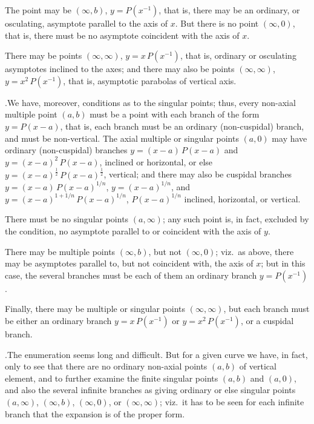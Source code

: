 \documentclass[11pt]{article}
\begin{document}
The point may be $(\infty,b)$, $y = P(x^{-1})$, that is, there may be an ordinary, or osculating, asymptote parallel to the axis of $x$. But there is no point $(\infty,0)$, that is, there must be no asymptote coincident with the axis of $x$.

There may be points $(\infty,\infty)$, $y = x\,P(x^{-1})$, that is, ordinary or osculating asymptotes inclined to the axes; and there may also be points $(\infty,\infty)$, $y = x^{2}\,P(x^{-1})$, that is, asymptotic parabolas of vertical axis.

\medskip

.\quad We have, moreover, conditions as to the singular points; thus, every non-axial multiple point $(a,b)$ must be a point with each branch of the form $y = P(x-a)$, that is, each branch must be an ordinary (non-cuspidal) branch, and must be non-vertical. The axial multiple or singular points $(a,0)$ may have ordinary (non-cuspidal) branches $y = (x-a)\,P(x-a)$ and $y = (x-a)^{2}\,P(x-a)$, inclined or horizontal, or else $y = (x-a)^{\frac{1}{2}}\,P(x-a)^{\frac{1}{2}}$, vertical; and there may also be cuspidal branches $y = (x-a)\,P(x-a)^{1/n}$, $y = (x-a)^{1/n}$, and $y = (x-a)^{1+1/n}\,P(x-a)^{1/n}$, $P(x-a)^{1/n}$ inclined, horizontal, or vertical.

There must be no singular points $(a,\infty)$; any such point is, in fact, excluded by the condition, no asymptote parallel to or coincident with the axis of $y$.

There may be multiple points $(\infty,b)$, but not $(\infty,0)$; viz.\ as above, there may be asymptotes parallel to, but not coincident with, the axis of $x$; but in this case, the several branches must be each of them an ordinary branch $y = P(x^{-1})$.

Finally, there may be multiple or singular points $(\infty,\infty)$, but each branch must be either an ordinary branch $y = x\,P(x^{-1})$ or $y = x^{2}\,P(x^{-1})$, or a cuspidal branch.

\medskip

.\quad The enumeration seems long and difficult. But for a given curve we have, in fact, only to see that there are no ordinary non-axial points $(a,b)$ of vertical element, and to further examine the finite singular points $(a,b)$ and $(a,0)$, and also the several infinite branches as giving ordinary or else singular points $(a,\infty)$, $(\infty,b)$, $(\infty,0)$, or $(\infty,\infty)$; viz.\ it has to be seen for each infinite branch that the expansion is of the proper form.
\end{document}
